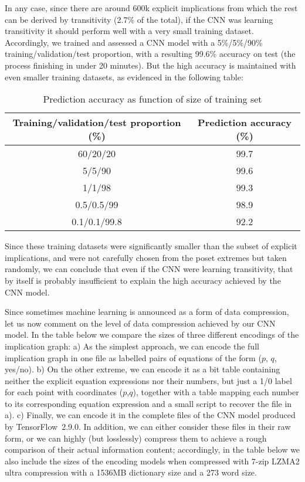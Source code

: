 \smallskip

In any case, since there are around 600k explicit implications from which the rest can be derived by transitivity (2.7\% of the total), if the CNN was learning transitivity it should perform well with a very small training dataset. Accordingly, we trained and assessed a CNN model with a 5\%/5\%/90\% training/validation/test proportion, with a resulting 99.6\% accuracy on test (the process finishing in under 20 minutes). But the high accuracy is maintained with even smaller training datasets, as evidenced in the following table:
\begin{table}[h]
\centering
\begin{tabular}{|c|c|}
\hline
  \textbf{Training/validation/test proportion (\%)} & \textbf{Prediction accuracy (\%)} \\\hline\hline
  60/20/20 & 99.7 \\\hline
  5/5/90 & 99.6 \\\hline
  1/1/98 & 99.3 \\\hline
  0.5/0.5/99 & 98.9 \\\hline
  0.1/0.1/99.8 & 92.2 \\
  \hline
\end{tabular}
\caption{Prediction accuracy as function of size of training set}
\end{table}

\noindent Since these training datasets were significantly smaller than the subset of explicit implications, and were not carefully chosen from the poset extremes but taken randomly, we can conclude that even if the CNN were learning transitivity, that by itself is probably insufficient to explain the high accuracy achieved by the CNN model.

\smallskip

Since sometimes machine learning is announced as a form of data compression, let us now comment on the level of data compression achieved by our CNN model. In the table below we compare the sizes of three different encodings of the implication graph: a) As the simplest approach, we can encode the full implication graph in one file as labelled pairs of equations of the form ($p$, $q$, yes/no). b) On the other extreme, we can encode it as a bit table containing neither the explicit equation expressions nor their numbers, but just a 1/0 label for each point with coordinates ($p$,$q$), together with a table mapping each number to its corresponding equation expression and a small script to recover the file in a). c) Finally, we can encode it in the complete files of the CNN model produced by TensorFlow 2.9.0. In addition, we can either consider these files in their raw form, or we can highly (but losslessly) compress them to achieve a rough comparison of their actual information content; accordingly, in the table below we also include the sizes of the encoding models when compressed with 7-zip LZMA2 ultra compression with a 1536MB dictionary size and a 273 word size.

